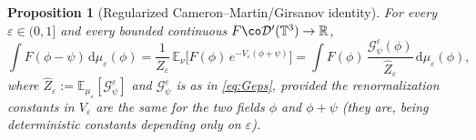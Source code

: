\documentclass[12pt]{article}
\newtheorem{proposition}{Proposition}
\theoremstyle{definition}
\newcommand{\T}{\mathbb{T}^3}
\newcommand{\R}{\mathbb{R}}
\newcommand{\E}{\mathbb{E}}
\newcommand{\dd}{\mathrm{d}}
\begin{document}
\begin{proposition}[Regularized Cameron--Martin/Girsanov identity]\label{prop:CV}
For every $\varepsilon\in(0,1]$ and every bounded continuous
$F\co\mathcal D'(\T)\to\R$,
\begin{equation}\label{eq:CVeps}
  \int F(\phi-\psi)\,\dd\mu_\varepsilon(\phi)
  =\frac{1}{Z_\varepsilon}\,\E_\nu\!\Big[F(\phi)\,e^{-V_\varepsilon(\phi+\psi)}\Big]
  =\int F(\phi)\,\frac{\mathcal G^\varepsilon_\psi(\phi)}{\widehat Z_\varepsilon}\,\dd\mu_\varepsilon(\phi),
\end{equation}
where $\widehat Z_\varepsilon:=\E_{\mu_\varepsilon}[\mathcal G^\varepsilon_\psi]$ and
$\mathcal G^\varepsilon_\psi$ is as in \eqref{eq:Geps}, provided the renormalization
constants in $V_\varepsilon$ are the same for the two fields $\phi$ and $\phi+\psi$
(they are, being deterministic constants depending only on $\varepsilon$).
\end{proposition}
\end{document}
